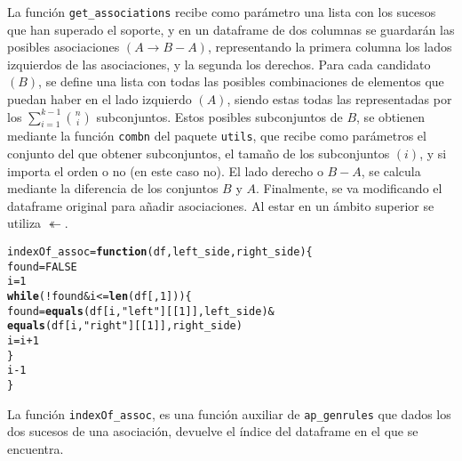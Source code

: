 \documentclass[12pt]{report}\usepackage[]{graphicx}\usepackage[dvipsnames]{xcolor}
\makeatletter
\newcommand{\hlnum}[1]{\textcolor[rgb]{0.686,0.059,0.569}{#1}}%
\newcommand{\hlstr}[1]{\textcolor[rgb]{0.192,0.494,0.8}{#1}}%
\newcommand{\hlopt}[1]{\textcolor[rgb]{0,0,0}{#1}}%
\newcommand{\hlstd}[1]{\textcolor[rgb]{0.345,0.345,0.345}{#1}}%
\newcommand{\hlkwa}[1]{\textcolor[rgb]{0.161,0.373,0.58}{\textbf{#1}}}%
\newcommand{\hlkwb}[1]{\textcolor[rgb]{0.69,0.353,0.396}{#1}}%
\newcommand{\hlkwc}[1]{\textcolor[rgb]{0.333,0.667,0.333}{#1}}%
\newcommand{\hlkwd}[1]{\textcolor[rgb]{0.737,0.353,0.396}{\textbf{#1}}}%
\newenvironment{kframe}{%
 \def\at@end@of@kframe{}%
 \ifinner\ifhmode%
  \def\at@end@of@kframe{\end{minipage}}%
  \begin{minipage}{\columnwidth}%
 \fi\fi%
 \def\FrameCommand##1{\hskip\@totalleftmargin \hskip-\fboxsep
 \colorbox{shadecolor}{##1}\hskip-\fboxsep
     \hskip-\linewidth \hskip-\@totalleftmargin \hskip\columnwidth}%
 \MakeFramed {\advance\hsize-\width
   \@totalleftmargin\z@ \linewidth\hsize
   \@setminipage}}%
 {\par\unskip\endMakeFramed%
 \at@end@of@kframe}
\newenvironment{knitrout}{}{} %
\makeatother
\begin{document}
			La función \texttt{get\_associations} recibe como parámetro una lista con los sucesos que han superado el soporte, y en un dataframe de dos columnas se guardarán las posibles asociaciones $(A \rightarrow B - A)$, representando la primera columna los lados izquierdos de las asociaciones, y la segunda los derechos. Para cada candidato $(B)$, se define una lista con todas las posibles combinaciones de elementos que puedan haber en el lado izquierdo $(A)$, siendo estas todas las representadas por los $\sum_{i = 1}^{k-1}\binom{n}{i}$ subconjuntos. Estos posibles subconjuntos de $B$, se obtienen mediante la función \texttt{combn} del paquete \texttt{utils}, que recibe como parámetros el conjunto del que obtener subconjuntos, el tamaño de los subconjuntos $(i)$, y si importa el orden o no (en este caso no). El lado derecho o $B - A$, se calcula mediante la diferencia de los conjuntos $B$ y $A$. Finalmente, se va modificando el dataframe original para añadir asociaciones. Al estar en un ámbito superior se utiliza $\twoheadleftarrow$. 
			
\begin{knitrout}
\color{fgcolor}\begin{kframe}
\begin{alltt}
\hlstd{indexOf_assoc} \hlkwb{=} \hlkwa{function}\hlstd{(}\hlkwc{df}\hlstd{,} \hlkwc{left_side}\hlstd{,} \hlkwc{right_side}\hlstd{) \{}
        \hlstd{found} \hlkwb{=} \hlnum{FALSE}
        \hlstd{i} \hlkwb{=} \hlnum{1}
        \hlkwa{while}\hlstd{(}\hlopt{!}\hlstd{found} \hlopt{&} \hlstd{i} \hlopt{<=} \hlkwd{len}\hlstd{(df[,}\hlnum{1}\hlstd{])) \{}
                \hlstd{found} \hlkwb{=} \hlkwd{equals}\hlstd{(df[i,} \hlstr{"left"}\hlstd{][[}\hlnum{1}\hlstd{]], left_side)} \hlopt{&}
                        \hlkwd{equals}\hlstd{(df[i,} \hlstr{"right"}\hlstd{][[}\hlnum{1}\hlstd{]], right_side)}
                \hlstd{i} \hlkwb{=} \hlstd{i} \hlopt{+} \hlnum{1}
        \hlstd{\}}
        \hlstd{i}\hlopt{-}\hlnum{1}
\hlstd{\}}
\end{alltt}
\end{kframe}
\end{knitrout}
			
			La función \texttt{indexOf\_assoc}, es una función auxiliar de \texttt{ap\_genrules} que dados los dos sucesos de una asociación, devuelve el índice del dataframe en el que se encuentra. 
			
\end{document}
